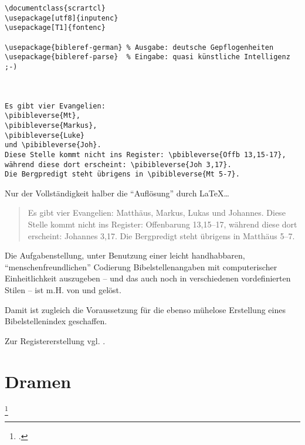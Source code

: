 \begin{lstlisting}
\documentclass{scrartcl} 
\usepackage[utf8]{inputenc}
\usepackage[T1]{fontenc}

\usepackage{bibleref-german} % Ausgabe: deutsche Gepflogenheiten
\usepackage{bibleref-parse}  % Eingabe: quasi künstliche Intelligenz ;-)



Es gibt vier Evangelien: 
\pibibleverse{Mt}, 
\pibibleverse{Markus}, 
\pibibleverse{Luke} 
und \pibibleverse{Joh}. 
Diese Stelle kommt nicht ins Register: \pbibleverse{Offb 13,15-17}, 
während diese dort erscheint: \pibibleverse{Joh 3,17}. 
Die Bergpredigt steht übrigens in \pibibleverse{Mt 5-7}.

\end{lstlisting}


Nur der Vollständigkeit halber die \enquote{Auflösung} durch \LaTeX\ldots

\begin{quotation}
    Es gibt vier Evangelien: Matthäus, Markus, Lukas und Johannes. Diese Stelle kommt
    nicht ins Register: Offenbarung 13,15–17, während diese dort erscheint: Johannes 3,17.
    Die Bergpredigt steht übrigens in Matthäus 5–7.
\end{quotation}

Die Aufgabenstellung, unter Benutzung einer leicht handhabbaren, \enquote{menschenfreundlichen} Codierung
Bibelstellenangaben mit computerischer Einheitlichkeit auszugeben -- und das auch noch in verschiedenen
vordefinierten Stilen -- ist m.H. von  und  gelöst.

Damit ist zugleich die Voraussetzung für die ebenso mühelose Erstellung eines Bibelstellenindex geschaffen.

Zur Registererstellung vgl. .




	

\section{Dramen}

\footcite[xxx]{lesetypografie}




